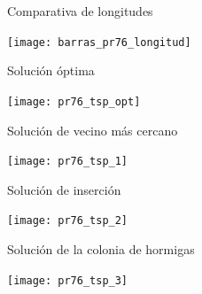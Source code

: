\begin{frame}{Comparativa de longitudes}
	\begin{center}
		\texttt{[image: barras\_pr76\_longitud]}
	\end{center}
	\end{frame}

\begin{frame}{Solución óptima}
	\begin{center}
		\texttt{[image: pr76\_tsp\_opt]}
	\end{center}
\end{frame}

\begin{frame}{Solución de vecino más cercano}
	\begin{center}
		\texttt{[image: pr76\_tsp\_1]}
	\end{center}
\end{frame}

\begin{frame}{Solución de inserción}
	\begin{center}
		\texttt{[image: pr76\_tsp\_2]}
	\end{center}
\end{frame}

\begin{frame}{Solución de la colonia de hormigas}
	\begin{center}
		\texttt{[image: pr76\_tsp\_3]}
	\end{center}
\end{frame}
